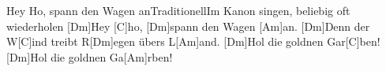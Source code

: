 \documentclass[../main.tex]{subfiles}
\begin{document}
\begin{songwithoutpagebreak}{Hey Ho, spann den Wagen an}{Traditionell}{Im Kanon singen, beliebig oft wiederholen}
[Dm]Hey [C]ho, [Dm]spann den Wagen [Am]an.
[Dm]Denn der W[C]ind treibt R[Dm]egen übers L[Am]and.
[Dm]Hol die goldnen Gar[C]ben!
[Dm]Hol die goldnen Ga[Am]rben!
\end{songwithoutpagebreak}
\end{document}
